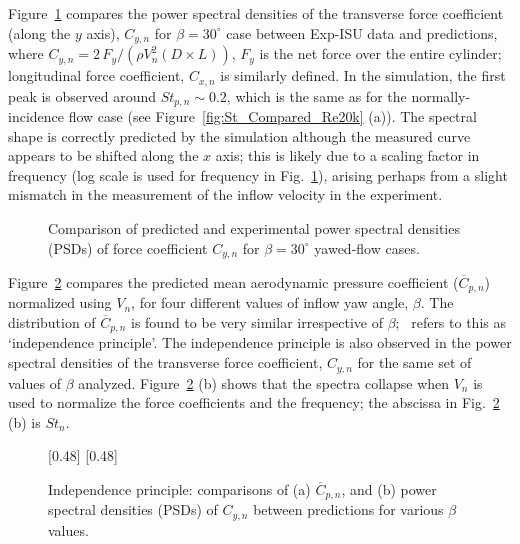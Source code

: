 Figure~\ref{fig:St_Compared_Yawed30_Exp-ISU} compares the power spectral
densities of the transverse force coefficient (along the $y$ axis), $C_{y,n}$
for $\beta=30^\circ$ case between Exp-ISU data and predictions, where $C_{y,n}
= 2\, F_y/ \left( \rho V^2_n (D \times L) \right)$, $F_y$ is the net force over
the entire cylinder; longitudinal force coefficient, $C_{x,n}$ is similarly
defined. In the simulation, the first peak is observed around $St_{p,n}\sim
0.2$, which is the same as for the normally-incidence flow case (see
Figure~\ref{fig:St_Compared_Re20k} (a)). The spectral shape is correctly
predicted by the simulation although the measured curve appears to be shifted
along the $x$ axis; this is likely due to a scaling factor in frequency (log
scale is used for frequency in Fig.~\ref{fig:St_Compared_Yawed30_Exp-ISU}),
arising perhaps from a slight mismatch in the measurement of the inflow
velocity in the experiment.
%
\begin{figure}[htb!]
  \caption{Comparison of predicted and experimental power spectral densities
    (PSDs) of force coefficient $C_{y,n}$ for $\beta=30^\circ$ yawed-flow
    cases.}
  \label{fig:St_Compared_Yawed30_Exp-ISU}
\end{figure}

Figure~\ref{fig:Compared_Yawed_Re20k} compares the predicted mean aerodynamic
pressure coefficient ($\overline{C}_{p,n}$) normalized using $V_n$, for four
different values of inflow yaw angle, $\beta$. The distribution of
$\overline{C}_{p,n}$ is found to be very similar irrespective of
$\beta$;~\cite{zdravkovich2003flow} refers to this as `independence principle'.
The independence principle is also observed in the power spectral densities of
the transverse force coefficient, $C_{y,n}$ for the same set of values of $\beta$
analyzed. Figure~\ref{fig:Compared_Yawed_Re20k} (b) shows that the spectra
collapse when $V_n$ is used to normalize the force coefficients and the frequency;
the abscissa in Fig.~\ref{fig:Compared_Yawed_Re20k} (b) is $St_n$.  
%
\begin{figure}[htb!]
  [0.48\linewidth]
    {}
  \hspace*{\fill}
  [0.48\linewidth]
    {}
  \caption{Independence principle: comparisons of (a) $\overline{C}_{p,n}$, and
    (b) power spectral densities (PSDs) of $C_{y,n}$ between predictions for various $\beta$ values.}
\label{fig:Compared_Yawed_Re20k}
\end{figure}

